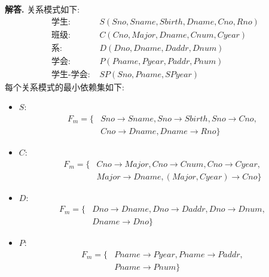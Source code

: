 \documentclass[12pt, oneside]{ctexart}
\numberwithin{figure}{section}
\numberwithin{table}{section}
\newenvironment{solution}{\par\noindent\textbf{解答. }}{\par}
\begin{document}
\begin{solution}
    关系模式如下:
    $$
        \begin{array}{ll}
            \text{学生: }      & S(Sno, Sname, Sbirth, Dname, Cno, Rno) \\
            \text{班级: }      & C(Cno, Major, Dname, Cnum, Cyear) \\
            \text{系: }        & D(Dno, Dname, Daddr, Dnum) \\
            \text{学会: }      & P(Pname, Pyear, Paddr, Pnum) \\
            \text{学生-学会: } & SP(Sno, Pname, SPyear)
        \end{array}
    $$
    每个关系模式的最小依赖集如下:
    \begin{itemize}
        \item $S$: 
            $$
                \begin{aligned}
                    F_m = \{
                        & Sno \rightarrow Sname, Sno \rightarrow Sbirth, Sno \rightarrow Cno, \\
                        & Cno \rightarrow Dname, Dname \rightarrow Rno \}
                \end{aligned}
            $$
        \item $C$:
            $$
                \begin{aligned}
                    F_m = \{
                    & Cno \rightarrow Major, Cno \rightarrow Cnum, Cno \rightarrow Cyear, \\
                    & Major \rightarrow Dname, (Major, Cyear) \rightarrow Cno \}
                \end{aligned}
            $$
        \item $D$:
            $$
                \begin{aligned}
                    F_m = \{
                    & Dno \rightarrow Dname, Dno \rightarrow Daddr, Dno \rightarrow Dnum, \\
                    & Dname \rightarrow Dno \}
                \end{aligned}
            $$
        \item $P$:
            $$
                \begin{aligned}
                    F_m = \{
                    & Pname \rightarrow Pyear, Pname \rightarrow Paddr, \\
                    & Pname \rightarrow Pnum \}
                \end{aligned}
            $$

\end{itemize}
\end{solution}
\end{document}
